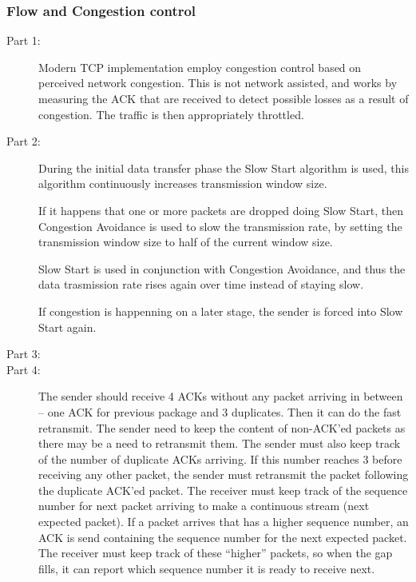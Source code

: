 \subsubsection{Flow and Congestion control}
\begin{description}
    \item[Part 1:] Modern TCP implementation employ congestion control based on
        perceived network congestion. This is not network assisted, and works
        by measuring the ACK that are received to detect possible losses as a
        result of congestion. The traffic is then appropriately throttled.

    \item[Part 2:]
        During the initial data transfer phase the Slow Start algorithm is
        used, this algorithm continuously increases transmission window size.

        If it happens that one or more packets are dropped doing Slow Start,
        then Congestion Avoidance is used to slow the transmission rate, by
        setting the transmission window size to half of the current window
        size.

        Slow Start is used in conjunction with Congestion Avoidance, and thus
        the data trasmission rate rises again over time instead of staying
        slow.

        If congestion is happenning on a later stage, the sender is forced into
        Slow Start again.

    \item[Part 3:] %
        
    \item[Part 4:]
    The sender should receive 4 ACKs without any packet arriving in between
    -- one ACK for previous package and 3 duplicates. Then it can do the fast
    retransmit.
    The sender need to keep the content of non-ACK'ed packets as there may be a need to retransmit them.
    The sender must also keep track of the number of duplicate ACKs arriving. If this number reaches 3 before receiving any other packet, the sender must retransmit the packet following the duplicate ACK'ed packet.
    The receiver must keep track of the sequence number for next packet arriving to make a continuous stream (next expected packet). If a packet arrives that has a higher sequence number, an ACK is send containing the sequence number for the next expected packet. The receiver must keep track of these ``higher'' packets, so when the gap fills, it can report which sequence number it is ready to receive next.

\end{description}
